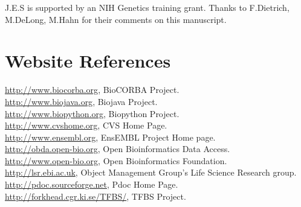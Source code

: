 \documentclass[12pt]{article}
\begin{document}
J.E.S is supported by an NIH Genetics training grant.  Thanks to
F.Dietrich, M.DeLong, M.Hahn for their comments on this manuscript.


 

\newpage

\section{Website References}

\url{http://www.biocorba.org}, BioCORBA Project. \\
\url{http://www.biojava.org}, Biojava Project. \\
\url{http://www.biopython.org}, Biopython Project. \\
\url{http://www.cvshome.org}, CVS Home Page. \\
\url{http://www.ensembl.org}, EnsEMBL Project Home page. \\
\url{http://obda.open-bio.org}, Open Bioinformatics Data Access. \\
\url{http://www.open-bio.org}, Open Bioinformatics Foundation. \\
\url{http://lsr.ebi.ac.uk}, Object Management Group's Life Science Research group. \\
\url{http://pdoc.sourceforge.net}, Pdoc Home Page. \\
\url{http://forkhead.cgr.ki.se/TFBS/}, TFBS Project. \\

\newpage 


\pagestyle{fancy}
\fancyhf{}
\renewcommand{\headrulewidth}{0pt}

\end{document}
